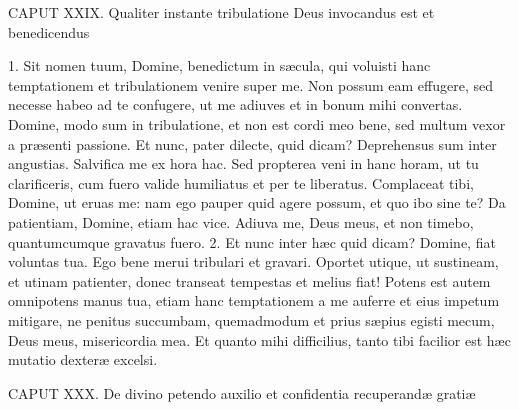 \documentclass[twoside]{article}
\begin{document}
CAPUT XXIX.
Qualiter instante tribulatione Deus invocandus est et benedicendus

1. Sit nomen tuum, Domine, benedictum in sæcula, qui voluisti hanc temptationem et tribulationem venire super me. Non possum eam effugere, sed necesse habeo ad te confugere, ut me adiuves et in bonum mihi convertas. Domine, modo sum in tribulatione, et non est cordi meo bene, sed multum vexor a præsenti passione. Et nunc, pater dilecte, quid dicam? Deprehensus sum inter angustias. Salvifica me ex hora hac. Sed propterea veni in hanc horam, ut tu clarificeris, cum fuero valide humiliatus et per te liberatus. Complaceat tibi, Domine, ut eruas me: nam ego pauper quid agere possum, et quo ibo sine te? Da patientiam, Domine, etiam hac vice. Adiuva me, Deus meus, et non timebo, quantumcumque gravatus fuero.
2. Et nunc inter hæc quid dicam? Domine, fiat voluntas tua. Ego bene merui tribulari et gravari. Oportet utique, ut sustineam, et utinam patienter, donec transeat tempestas et melius fiat! Potens est autem omnipotens manus tua, etiam hanc temptationem a me auferre et eius impetum mitigare, ne penitus succumbam, quemadmodum et prius sæpius egisti mecum, Deus meus, misericordia mea. Et quanto mihi difficilius, tanto tibi facilior est hæc mutatio dexteræ excelsi.


CAPUT XXX.
De divino petendo auxilio et confidentia recuperandæ gratiæ
\end{document}
